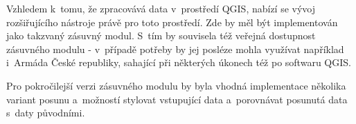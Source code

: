 Vzhledem k~tomu, že  zpracovává data v~prostředí QGIS, nabízí se vývoj rozšiřujícího
nástroje právě pro toto prostředí. Zde by měl být implementován jako takzvaný zásuvný modul. S~tím
by souvisela též veřejná dostupnost zásuvného modulu - v~případě potřeby by jej posléze mohla využívat
například i~Armáda České republiky, sahající při některých úkonech též po softwaru QGIS. 

Pro pokročilejší verzi zásuvného modulu by byla vhodná implementace několika variant posunu
a~možností stylovat vstupující data a~porovnávat posunutá data s~daty původními. 


